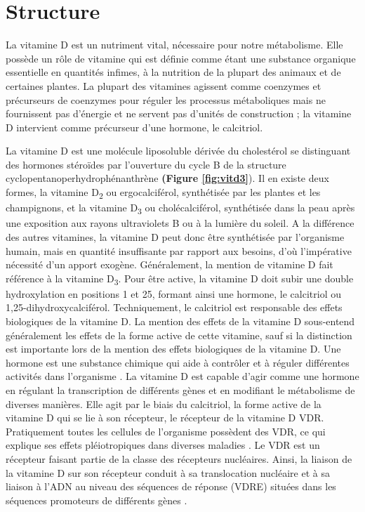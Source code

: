 \documentclass[
  a4paper,
  DIV=11,
  numbers=noendperiod,
  listof=totoc]{scrreprt}
\begin{document}
\hypertarget{structure}{%
\section{Structure}\label{structure}}

La vitamine D est un nutriment vital, nécessaire pour notre métabolisme.
Elle possède un rôle de vitamine qui est définie comme étant une
substance organique essentielle en quantités infimes, à la nutrition de
la plupart des animaux et de certaines plantes. La plupart des vitamines
agissent comme coenzymes et précurseurs de coenzymes pour réguler les
processus métaboliques mais ne fournissent pas d'énergie et ne servent
pas d'unités de construction \autocite{Ellison.2020} ; la vitamine D
intervient comme précurseur d'une hormone, le calcitriol.

La vitamine D est une molécule liposoluble dérivée du cholestérol se
distinguant des hormones stéroïdes par l'ouverture du cycle B de la
structure cyclopentanoperhydrophénanthrène \autocite{Norman.2008}
\textbf{(Figure \ref{fig:vitd3}}). Il en existe deux formes, la vitamine
D\textsubscript{2} ou ergocalciférol, synthétisée par les plantes et les
champignons, et la vitamine D\textsubscript{3} ou cholécalciférol,
synthétisée dans la peau après une exposition aux rayons ultraviolets B
ou à la lumière du soleil. A la différence des autres vitamines, la
vitamine D peut donc être synthétisée par l'organisme humain, mais en
quantité insuffisante par rapport aux besoins, d'où l'impérative
nécessité d'un apport exogène. Généralement, la mention de vitamine D
fait référence à la vitamine D\textsubscript{3}. Pour être active, la
vitamine D doit subir une double hydroxylation en positions 1 et 25,
formant ainsi une hormone, le calcitriol ou 1,25-dihydroxycalciférol.
Techniquement, le calcitriol est responsable des effets biologiques de
la vitamine D. La mention des effets de la vitamine D sous-entend
généralement les effets de la forme active de cette vitamine, sauf si la
distinction est importante lors de la mention des effets biologiques de
la vitamine D. Une hormone est une substance chimique qui aide à
contrôler et à réguler différentes activités dans l'organisme
\autocite{Ellison.2020}. La vitamine D est capable d'agir comme une
hormone en régulant la transcription de différents gènes et en modifiant
le métabolisme de diverses manières. Elle agit par le biais du
calcitriol, la forme active de la vitamine D qui se lie à son récepteur,
le récepteur de la vitamine D \acs{VDR}. Pratiquement toutes les
cellules de l'organisme possèdent des VDR, ce qui explique ses effets
pléiotropiques dans diverses maladies
\autocite{Ellison.2020,Caprio.2017,Norman.2008}. Le \ac{VDR} est un
récepteur faisant partie de la classe des récepteurs nucléaires. Ainsi,
la liaison de la vitamine D sur son récepteur conduit à sa translocation
nucléaire et à sa liaison à l'ADN au niveau des séquences de réponse
(\acs{VDRE}) situées dans les séquences promoteurs de différents gènes
\autocite{Bouillon.2008}.
\end{document}
